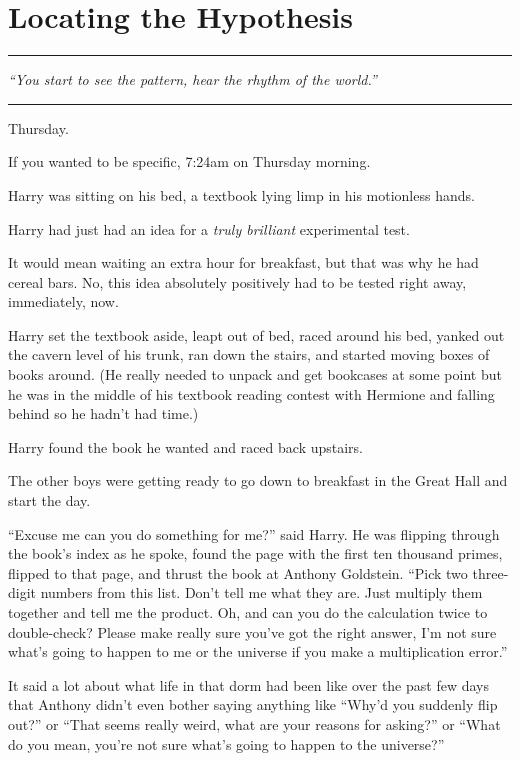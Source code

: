 \chapter{Locating the Hypothesis}\label{locating-the-hypothesis}

\begin{center}\rule{3in}{0.4pt}\end{center}

\emph{``You start to see the pattern, hear the rhythm of the world.''}

\begin{center}\rule{3in}{0.4pt}\end{center}

Thursday.

If you wanted to be specific, 7:24am on Thursday morning.

Harry was sitting on his bed, a textbook lying limp in his motionless
hands.

Harry had just had an idea for a \emph{truly brilliant} experimental
test.

It would mean waiting an extra hour for breakfast, but that was why he
had cereal bars. No, this idea absolutely positively had to be tested
right away, immediately, now.

Harry set the textbook aside, leapt out of bed, raced around his bed,
yanked out the cavern level of his trunk, ran down the stairs, and
started moving boxes of books around. (He really needed to unpack and
get bookcases at some point but he was in the middle of his textbook
reading contest with Hermione and falling behind so he hadn't had time.)

Harry found the book he wanted and raced back upstairs.

The other boys were getting ready to go down to breakfast in the Great
Hall and start the day.

``Excuse me can you do something for me?'' said Harry. He was flipping
through the book's index as he spoke, found the page with the first ten
thousand primes, flipped to that page, and thrust the book at Anthony
Goldstein. ``Pick two three-digit numbers from this list. Don't tell me
what they are. Just multiply them together and tell me the product. Oh,
and can you do the calculation twice to double-check? Please make really
sure you've got the right answer, I'm not sure what's going to happen to
me or the universe if you make a multiplication error.''

It said a lot about what life in that dorm had been like over the past
few days that Anthony didn't even bother saying anything like ``Why'd
you suddenly flip out?'' or ``That seems really weird, what are your
reasons for asking?'' or ``What do you mean, you're not sure what's
going to happen to the universe?''

